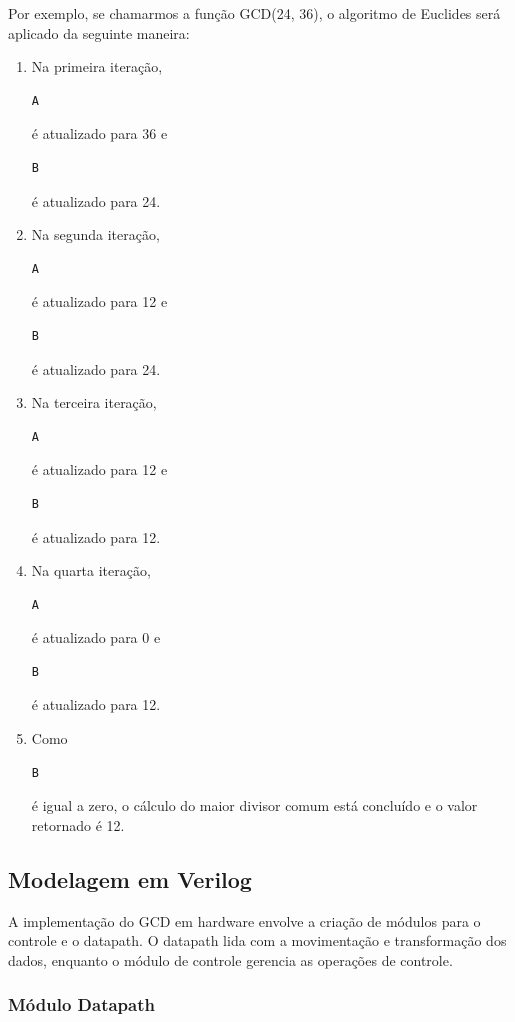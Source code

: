 \documentclass[a4paper,11pt]{article} %
\begin{document}
Por exemplo, se chamarmos a função GCD(24, 36), o algoritmo de Euclides será aplicado da seguinte maneira:

\begin{enumerate}
    \item Na primeira iteração, \begin{verbatim}A\end{verbatim} é atualizado para 36 e \begin{verbatim}B\end{verbatim} é atualizado para 24.
    \item Na segunda iteração, \begin{verbatim}A\end{verbatim} é atualizado para 12 e \begin{verbatim}B\end{verbatim} é atualizado para 24.
    \item Na terceira iteração, \begin{verbatim}A\end{verbatim} é atualizado para 12 e \begin{verbatim}B\end{verbatim} é atualizado para 12.
    \item Na quarta iteração, \begin{verbatim}A\end{verbatim} é atualizado para 0 e \begin{verbatim}B\end{verbatim} é atualizado para 12.
    \item Como \begin{verbatim}B\end{verbatim} é igual a zero, o cálculo do maior divisor comum está concluído e o valor retornado é 12.
\end{enumerate}


\subsection{Modelagem em Verilog}

A implementação do GCD em hardware envolve a
criação de módulos para o controle e o datapath.
O datapath lida com a movimentação e transformação dos dados,
enquanto o módulo de controle gerencia as operações de controle.

\subsubsection{Módulo Datapath}
\end{document}
